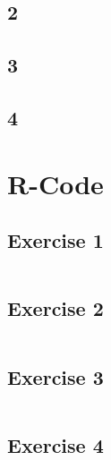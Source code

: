 \documentclass{article}
\begin{document}
    \subsection*{2}
    
    \subsection*{3}
    
    \subsection*{4}

    
  \section{R-Code}
    \subsection{Exercise 1}\label{sec:RE1}
      \begin{lstlisting}[language=R]
      \end{lstlisting}
    \subsection{Exercise 2}\label{sec:RE2}
      \begin{lstlisting}[language=R]
      \end{lstlisting}
    \subsection{Exercise 3}\label{sec:RE3}
      \begin{lstlisting}[language=R]
      \end{lstlisting}
    \subsection{Exercise 4}\label{sec:RE4}
      \begin{lstlisting}[language=R]
      \end{lstlisting}
\end{document}
